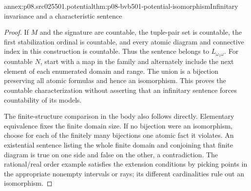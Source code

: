 \begin{annexitem}{annex:p08.src025501.potential}{thm:p08-bvb501-potential-isomorphism}{Infinitary invariance and a characteristic sentence}
\begin{proof}
If \(M\) and the signature are countable, the tuple-pair set is countable,
the first stabilization ordinal is countable, and every atomic diagram
and connective index in this construction is countable. Thus the sentence
belongs to \(L_{\omega_1\omega}\). For countable \(N\), start with
a map in the family and alternately include the next element of each
enumerated domain and range. The union is a bijection preserving all
atomic formulas and hence an isomorphism. This proves the countable
characterization without asserting that an infinitary sentence forces
countability of its models.

The finite-structure comparison in the body also follows directly.
Elementary equivalence fixes the finite domain size. If no bijection were
an isomorphism, choose for each of the finitely many bijections one atomic
fact it violates. An existential sentence listing the whole finite domain
and conjoining that finite diagram is true on one side and false on the
other, a contradiction. The rational/real order example satisfies the
extension conditions by picking points in the appropriate nonempty intervals
or rays; its different cardinalities rule out an isomorphism.
\end{proof}
\end{annexitem}

